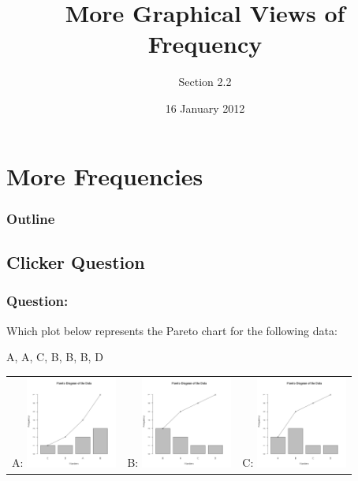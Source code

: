 
\section{More Frequencies}

\title{More Graphical Views of Frequency}
\subtitle{Section 2.2}

\date{16 January 2012}

\begin{frame}
  \titlepage
\end{frame}

\begin{frame}
  \frametitle{Outline}
  \tableofcontents[hideothersubsections,sectionstyle=show/hide]
\end{frame}


\subsection{Clicker Question}


\begin{frame}
  \frametitle{Question:}

  Which plot below represents the Pareto chart for the following data:

    A, A, C, B, B, B, D

    \begin{tabular}{ccc}
      A: \includegraphics[width=3cm]{img/paretoQuizW1D2-a} &
      B: \includegraphics[width=3cm]{img/paretoQuizW1D2-b} &
      C: \includegraphics[width=3cm]{img/paretoQuizW1D2-c}
  \end{tabular}

\end{frame}


